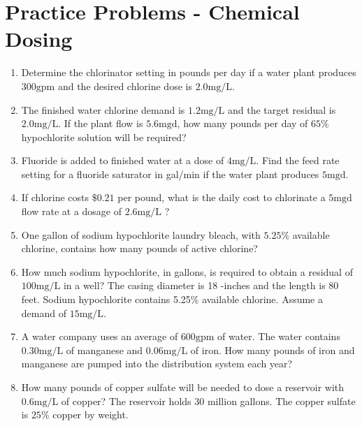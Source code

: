 \section*{Practice Problems - Chemical Dosing}
\begin{enumerate}

  \item Determine the chlorinator setting in pounds per day if a water plant produces $300 \mathrm{gpm}$ and the desired chlorine dose is $2.0 \mathrm{mg} / \mathrm{L}$.

  \item The finished water chlorine demand is $1.2 \mathrm{mg} / \mathrm{L}$ and the target residual is $2.0 \mathrm{mg} / \mathrm{L}$. If the plant flow is $5.6 \mathrm{mgd}$, how many pounds per day of $65 \%$ hypochlorite solution will be required?

  \item Fluoride is added to finished water at a dose of $4 \mathrm{mg} / \mathrm{L}$. Find the feed rate setting for a fluoride saturator in gal/min if the water plant produces $5 \mathrm{mgd}$.

  \item If chlorine costs $\$ 0.21$ per pound, what is the daily cost to chlorinate a $5 \mathrm{mgd}$ flow rate at a dosage of $2.6 \mathrm{mg} / \mathrm{L}$ ?

  \item One gallon of sodium hypochlorite laundry bleach, with $5.25 \%$ available chlorine, contains how many pounds of active chlorine?

  \item How much sodium hypochlorite, in gallons, is required to obtain a residual of $100 \mathrm{mg} / \mathrm{L}$ in a well? The casing diameter is 18 -inches and the length is 80 feet. Sodium hypochlorite contains 5.25\% available chlorine. Assume a demand of $15 \mathrm{mg} / \mathrm{L}$.

  \item A water company uses an average of $600 \mathrm{gpm}$ of water. The water contains $0.30 \mathrm{mg} / \mathrm{L}$ of manganese and $0.06 \mathrm{mg} / \mathrm{L}$ of iron. How many pounds of iron and manganese are pumped into the distribution system each year?

  \item How many pounds of copper sulfate will be needed to dose a reservoir with $0.6 \mathrm{mg} / \mathrm{L}$ of copper? The reservoir holds 30 million gallons. The copper sulfate is $25 \%$ copper by weight.


\end{enumerate}
